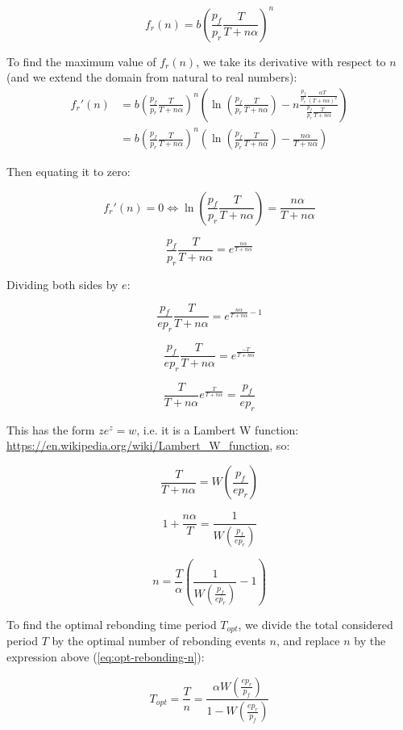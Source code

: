 \documentclass{article}
\begin{document}
\begin{equation}
  \label{eq:n-rebond_1}
f_r(n) = b \left(\frac{p_f}{p_r} \frac{T}{T+n \alpha} \right)^{n}
\end{equation}

To find the maximum value of $f_r(n)$, we take its derivative with respect to $n$ (and we extend the domain from natural to real numbers):
\[
\begin{split}
  f_r'(n) &= b \left(\frac{p_f}{p_r} \frac{T}{T+n\alpha}\right)^n \left(\ln\left(\frac{p_f}{p_r} \frac{T}{T+n\alpha}\right) - n \frac{\frac{p_f}{p_r} \frac{\alpha T}{(T+n\alpha)^2}}{\frac{p_f}{p_r} \frac{T}{T+n\alpha}}\right) \\
  &= b \left(\frac{p_f}{p_r} \frac{T}{T+n\alpha}\right)^n \left(\ln\left(\frac{p_f}{p_r} \frac{T}{T+n\alpha}\right) - \frac{n\alpha}{T+n\alpha}\right)
\end{split}
\]

Then equating it to zero:

\[
f_r'(n) = 0 \iff \ln\left(\frac{p_f}{p_r} \frac{T}{T+n\alpha}\right) = \frac{n\alpha}{T+n\alpha}
\]

\[
\frac{p_f}{p_r} \frac{T}{T+n\alpha} = e^{\frac{n\alpha}{T+n\alpha}}
\]

Dividing both sides by $e$:

\[
\frac{p_f}{e p_r} \frac{T}{T+n\alpha} = e^{\frac{n\alpha}{T+n\alpha} - 1}
\]

\[
\frac{p_f}{e p_r} \frac{T}{T+n\alpha} = e^{\frac{-T}{T+n\alpha}}
\]

\[
\frac{T}{T+n\alpha} e^{\frac{T}{T+n\alpha}} = \frac{p_f}{e p_r} 
\]

This has the form $z e^z = w$, i.e. it is a Lambert W function: \url{https://en.wikipedia.org/wiki/Lambert_W_function}, so:

\[
\frac{T}{T+n\alpha} = W\left(\frac{p_f}{e p_r} \right)
\]

\[
1 + \frac{n\alpha}{T} = \frac{1}{W\left(\frac{p_f}{e p_r} \right)}
\]

\begin{equation}
  \label{eq:opt-rebonding-n}
n = \frac{T}{\alpha} \left(\frac{1}{W\left(\frac{p_f}{e p_r} \right)} - 1\right)
\end{equation}

To find the optimal rebonding time period $T_{opt}$, we divide the total considered period $T$ by the optimal number of rebonding events $n$, and replace $n$ by the expression above (\ref{eq:opt-rebonding-n}):

\begin{equation}
  \label{eq:opt-rebonding-prices}
T_{opt} = \frac{T}{n} = \frac{\alpha W\left(\frac{e p_r}{p_f}\right)}{1 - W\left(\frac{e p_r}{p_f}\right)}
\end{equation}
\end{document}
